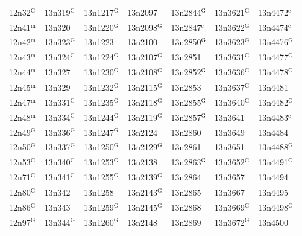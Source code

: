 \documentclass[12pt, oneside]{amsart}
\begin{document}
{\begin{longtable}{*{7}{>{\raggedright\arraybackslash}p{}}}
12n32$^{\mathrm{G}}$ & 13n319$^{\mathrm{G}}$ & 13n1217$^{\mathrm{G}}$ & 13n2097 & 13n2844$^{\mathrm{G}}$ & 13n3621$^{\mathrm{G}}$ & 13n4472$^{\mathrm{c}}$ \\
12n41$^{\mathrm{m}}$ & 13n320 & 13n1220$^{\mathrm{G}}$ & 13n2098$^{\mathrm{G}}$ & 13n2847$^{\mathrm{c}}$ & 13n3622$^{\mathrm{G}}$ & 13n4474$^{\mathrm{c}}$ \\
12n42$^{\mathrm{m}}$ & 13n323$^{\mathrm{G}}$ & 13n1223 & 13n2100 & 13n2850$^{\mathrm{G}}$ & 13n3623$^{\mathrm{G}}$ & 13n4476$^{\mathrm{G}}$ \\
12n43$^{\mathrm{m}}$ & 13n324$^{\mathrm{G}}$ & 13n1224$^{\mathrm{G}}$ & 13n2107$^{\mathrm{G}}$ & 13n2851 & 13n3631$^{\mathrm{G}}$ & 13n4477$^{\mathrm{G}}$ \\
12n44$^{\mathrm{m}}$ & 13n327 & 13n1230$^{\mathrm{G}}$ & 13n2108$^{\mathrm{G}}$ & 13n2852$^{\mathrm{G}}$ & 13n3636$^{\mathrm{G}}$ & 13n4478$^{\mathrm{G}}$ \\
12n45$^{\mathrm{m}}$ & 13n329 & 13n1232$^{\mathrm{G}}$ & 13n2115$^{\mathrm{G}}$ & 13n2853 & 13n3637$^{\mathrm{G}}$ & 13n4481 \\
12n47$^{\mathrm{m}}$ & 13n331$^{\mathrm{G}}$ & 13n1235$^{\mathrm{G}}$ & 13n2118$^{\mathrm{G}}$ & 13n2855$^{\mathrm{G}}$ & 13n3640$^{\mathrm{G}}$ & 13n4482$^{\mathrm{G}}$ \\
12n48$^{\mathrm{m}}$ & 13n334$^{\mathrm{G}}$ & 13n1244$^{\mathrm{G}}$ & 13n2119$^{\mathrm{G}}$ & 13n2857$^{\mathrm{G}}$ & 13n3641 & 13n4483$^{\mathrm{c}}$ \\
12n49$^{\mathrm{G}}$ & 13n336$^{\mathrm{G}}$ & 13n1247$^{\mathrm{G}}$ & 13n2124 & 13n2860 & 13n3649 & 13n4484 \\
12n50$^{\mathrm{G}}$ & 13n337$^{\mathrm{G}}$ & 13n1250$^{\mathrm{G}}$ & 13n2129$^{\mathrm{G}}$ & 13n2861 & 13n3651 & 13n4488$^{\mathrm{G}}$ \\
12n53$^{\mathrm{G}}$ & 13n340$^{\mathrm{G}}$ & 13n1253$^{\mathrm{G}}$ & 13n2138 & 13n2863$^{\mathrm{G}}$ & 13n3652$^{\mathrm{G}}$ & 13n4491$^{\mathrm{G}}$ \\
12n71$^{\mathrm{G}}$ & 13n341$^{\mathrm{G}}$ & 13n1255$^{\mathrm{G}}$ & 13n2139$^{\mathrm{G}}$ & 13n2864 & 13n3657 & 13n4494 \\
12n80$^{\mathrm{G}}$ & 13n342 & 13n1258 & 13n2143$^{\mathrm{G}}$ & 13n2865 & 13n3667 & 13n4495 \\
12n86$^{\mathrm{G}}$ & 13n343 & 13n1259$^{\mathrm{G}}$ & 13n2145$^{\mathrm{G}}$ & 13n2868 & 13n3669$^{\mathrm{G}}$ & 13n4498$^{\mathrm{G}}$ \\
12n97$^{\mathrm{G}}$ & 13n344$^{\mathrm{G}}$ & 13n1260$^{\mathrm{G}}$ & 13n2148 & 13n2869 & 13n3672$^{\mathrm{G}}$ & 13n4500 \\

\end{longtable}}
\end{document}
